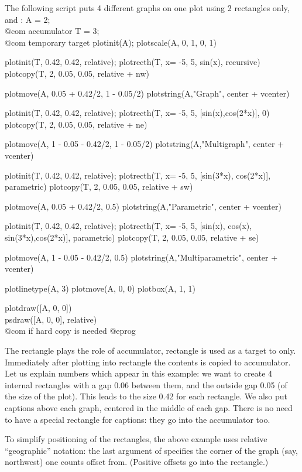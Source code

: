 The following script puts 4 different graphs on one plot using 2 rectangles
only,  and :
\bprog
  A = 2;   \\@com accumulator
  T = 3;   \\@com temporary target
  plotinit(A);         plotscale(A, 0, 1, 0, 1)

  plotinit(T, 0.42, 0.42, relative);
  plotrecth(T, x= -5, 5, sin(x), recursive)
  plotcopy(T, 2, 0.05, 0.05, relative + nw)

  plotmove(A, 0.05 + 0.42/2, 1 - 0.05/2)
  plotstring(A,"Graph", center + vcenter)

  plotinit(T, 0.42, 0.42, relative);
  plotrecth(T, x= -5, 5, [sin(x),cos(2*x)], 0)
  plotcopy(T, 2, 0.05, 0.05, relative + ne)

  plotmove(A, 1 - 0.05 - 0.42/2, 1 - 0.05/2)
  plotstring(A,"Multigraph", center + vcenter)

  plotinit(T, 0.42, 0.42, relative);
  plotrecth(T, x= -5, 5, [sin(3*x), cos(2*x)], parametric)
  plotcopy(T, 2, 0.05, 0.05, relative + sw)

  plotmove(A, 0.05 + 0.42/2, 0.5)
  plotstring(A,"Parametric", center + vcenter)

  plotinit(T, 0.42, 0.42, relative);
  plotrecth(T, x= -5, 5, [sin(x), cos(x), sin(3*x),cos(2*x)], parametric)
  plotcopy(T, 2, 0.05, 0.05, relative + se)

  plotmove(A, 1 - 0.05 - 0.42/2, 0.5)
  plotstring(A,"Multiparametric", center + vcenter)

  plotlinetype(A, 3)
  plotmove(A, 0, 0)
  plotbox(A, 1, 1)

  plotdraw([A, 0, 0])
  \\ psdraw([A, 0, 0], relative)          \\ @com if hard copy is needed
@eprog

The rectangle  plays the role of accumulator, rectangle  is
used as a target to  only.  Immediately after plotting into
rectangle  the contents is copied to accumulator.  Let us explain
numbers which appear in this example: we want to create 4 internal rectangles
with a gap 0.06 between them, and the outside gap 0.05 (of the size of the
plot).  This leads to the size 0.42 for each rectangle.  We also
put captions above each graph, centered in the middle of each gap.  There
is no need to have a special rectangle for captions: they go into the
accumulator too.

To simplify positioning of the rectangles, the above example uses relative
``geographic'' notation: the last argument of  specifies the
corner of the graph (say, northwest) one counts offset from. (Positive
offsets go into the rectangle.)


